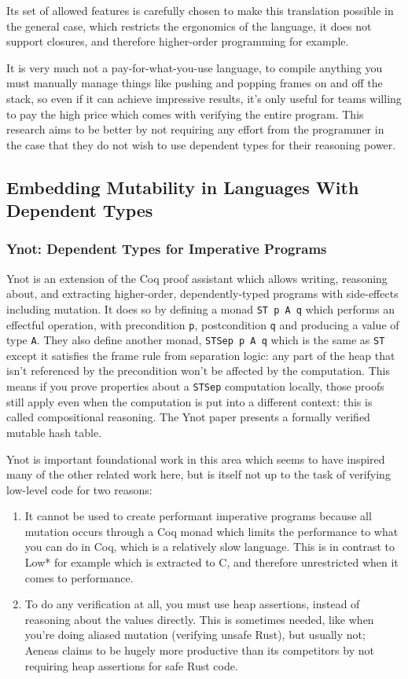 \documentclass[12pt,twoside]{report}
\begin{document}
Its set of allowed features is carefully chosen to make this translation possible in the general case, which restricts the ergonomics of the language, it does not support closures, and therefore higher-order programming for example.

It is very much not a pay-for-what-you-use language, to compile anything you must manually manage things like pushing and popping frames on and off the stack, so even if it can achieve impressive results, it's only useful for teams willing to pay the high price which comes with verifying the entire program. This research aims to be better by not requiring any effort from the programmer in the case that they do not wish to use dependent types for their reasoning power.

\subsection{Embedding Mutability in Languages With Dependent Types}

\subsubsection{Ynot: Dependent Types for Imperative Programs}
Ynot\citep{nanevski_ynot_2008} is an extension of the Coq proof assistant which allows writing, reasoning about, and extracting higher-order, dependently-typed programs with side-effects including mutation. It does so by defining a monad \verb|ST p A q| which performs an effectful operation, with precondition \verb|p|, postcondition \verb|q| and producing a value of type \verb|A|. They also define another monad, \verb|STSep p A q| which is the same as \verb|ST| except it satisfies the frame rule from separation logic: any part of the heap that isn't referenced by the precondition won't be affected by the computation. This means if you prove properties about a \verb|STSep| computation locally, those proofs still apply even when the computation is put into a different context: this is called compositional reasoning. The Ynot paper presents a formally verified mutable hash table.

Ynot is important foundational work in this area which seems to have inspired many of the other related work here, but is itself not up to the task of verifying low-level code for two reasons:

\begin{enumerate}
  \item It cannot be used to create performant imperative programs because all mutation occurs through a Coq monad which limits the performance to what you can do in Coq, which is a relatively slow language. This is in contrast to Low*\citep{protzenko_low_2017} for example which is extracted to C, and therefore unrestricted when it comes to performance.
  \item To do any verification at all, you must use heap assertions, instead of reasoning about the values directly. This is sometimes needed, like when you're doing aliased mutation (verifying unsafe Rust), but usually not; Aeneas\citep{aeneas} claims to be hugely more productive than its competitors by not requiring heap assertions for safe Rust code.
\end{enumerate}
\end{document}

